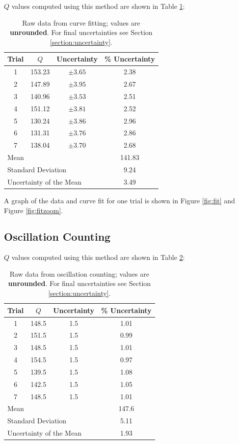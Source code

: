 \documentclass[aps,twocolumn,secnumarabic,nobalancelastpage,amsmath,amssymb,nofootinbib]{revtex4}
\begin{document}
\(Q\) values computed using this method are shown in Table \ref{table:fit}:
\begin{table}[h]
    \begin{tabular}{c|c|c|c}
        Trial & \(Q\) & Uncertainty & \% Uncertainty \\
        \hline
        1   & 153.23    & \(\pm 3.65\) & 2.38 \\
        2   & 147.89    & \(\pm 3.95\) & 2.67 \\
        3	& 140.96	& \(\pm 3.53\) & 2.51 \\
        4	& 151.12	& \(\pm 3.81\) & 2.52 \\
        5	& 130.24	& \(\pm 3.86\) & 2.96 \\
        6	& 131.31	& \(\pm 3.76\) & 2.86 \\
        7	& 138.04	& \(\pm 3.70\) & 2.68 \\
        \hline
        \multicolumn{3}{l}{Mean} & 141.83 \\
        \multicolumn{3}{l}{Standard Deviation} & 9.24 \\
        \multicolumn{3}{l}{Uncertainty of the Mean} & 3.49
    \end{tabular}
    \caption{Raw data from curve fitting; values are \textbf{unrounded}. For final uncertainties see Section
        \ref{section:uncertainty}.}
    \label{table:fit}
\end{table}

A graph of the data and curve fit for one trial is shown in Figure \ref{fig:fit} and Figure \ref{fig:fitzoom}.

\subsection{Oscillation Counting}

\(Q\) values computed using this method are shown in Table \ref{table:oscillation}:
\begin{table}[h]
    \begin{tabular}{c|c|c|c}
        Trial & \(Q\) & Uncertainty & \% Uncertainty \\
        \hline
        1   & 148.5 & 1.5 & 1.01 \\
        2   & 151.5 & 1.5 & 0.99 \\
        3	& 148.5 & 1.5 & 1.01 \\
        4	& 154.5 & 1.5 & 0.97 \\
        5	& 139.5 & 1.5 & 1.08 \\
        6	& 142.5 & 1.5 & 1.05 \\
        7	& 148.5 & 1.5 & 1.01 \\
        \hline
        \multicolumn{3}{l}{Mean} & 147.6 \\
        \multicolumn{3}{l}{Standard Deviation} & 5.11 \\
        \multicolumn{3}{l}{Uncertainty of the Mean} & 1.93
    \end{tabular}
    \caption{Raw data from oscillation counting; values are \textbf{unrounded}. For final uncertainties see Section
        \ref{section:uncertainty}.}
    \label{table:oscillation}
\end{table}
\end{document}
